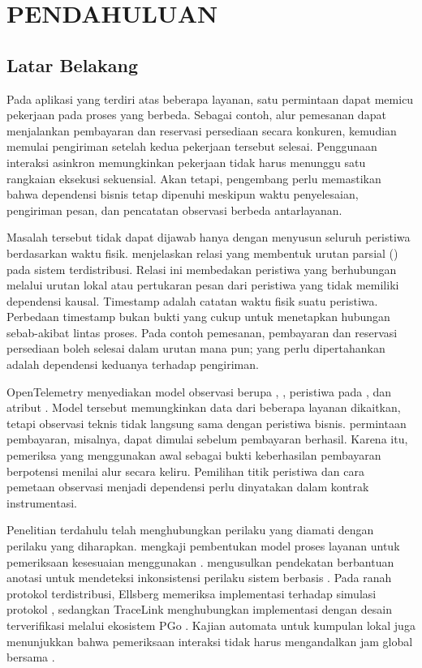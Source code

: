 \chapter{PENDAHULUAN}

\section{Latar Belakang}
Pada aplikasi yang terdiri atas beberapa layanan, satu permintaan dapat memicu pekerjaan pada proses yang berbeda. Sebagai contoh, alur pemesanan dapat menjalankan pembayaran dan reservasi persediaan secara konkuren, kemudian memulai pengiriman setelah kedua pekerjaan tersebut selesai. Penggunaan interaksi asinkron memungkinkan pekerjaan tidak harus menunggu satu rangkaian eksekusi sekuensial. Akan tetapi, pengembang perlu memastikan bahwa dependensi bisnis tetap dipenuhi meskipun waktu penyelesaian, pengiriman pesan, dan pencatatan observasi berbeda antarlayanan.

Masalah tersebut tidak dapat dijawab hanya dengan menyusun seluruh peristiwa berdasarkan waktu fisik. \citet{lamport1978} menjelaskan relasi  yang membentuk urutan parsial () pada sistem terdistribusi. Relasi ini membedakan peristiwa yang berhubungan melalui urutan lokal atau pertukaran pesan dari peristiwa yang tidak memiliki dependensi kausal. Timestamp adalah catatan waktu fisik suatu peristiwa. Perbedaan timestamp bukan bukti yang cukup untuk menetapkan hubungan sebab-akibat lintas proses. Pada contoh pemesanan, pembayaran dan reservasi persediaan boleh selesai dalam urutan mana pun; yang perlu dipertahankan adalah dependensi keduanya terhadap pengiriman.

OpenTelemetry menyediakan model observasi berupa , , peristiwa pada , dan atribut \citep{oteltraces}. Model tersebut memungkinkan data dari beberapa layanan dikaitkan, tetapi observasi teknis tidak langsung sama dengan peristiwa bisnis.  permintaan pembayaran, misalnya, dapat dimulai sebelum pembayaran berhasil. Karena itu, pemeriksa yang menggunakan awal  sebagai bukti keberhasilan pembayaran berpotensi menilai alur secara keliru. Pemilihan titik peristiwa dan cara pemetaan observasi menjadi dependensi perlu dinyatakan dalam kontrak instrumentasi.

Penelitian terdahulu telah menghubungkan perilaku yang diamati dengan perilaku yang diharapkan. \citet{sakai2022} mengkaji pembentukan model proses layanan untuk pemeriksaan kesesuaian menggunakan . \citet{sun2024} mengusulkan pendekatan berbantuan anotasi untuk mendeteksi inkonsistensi perilaku sistem berbasis . Pada ranah protokol terdistribusi, Ellsberg memeriksa implementasi terhadap simulasi protokol \citep{ding2025}, sedangkan TraceLink menghubungkan  implementasi dengan desain terverifikasi melalui ekosistem PGo \citep{hackett2025}. Kajian automata untuk kumpulan  lokal juga menunjukkan bahwa pemeriksaan interaksi tidak harus mengandalkan jam global bersama \citep{weilkennedy2025}.

